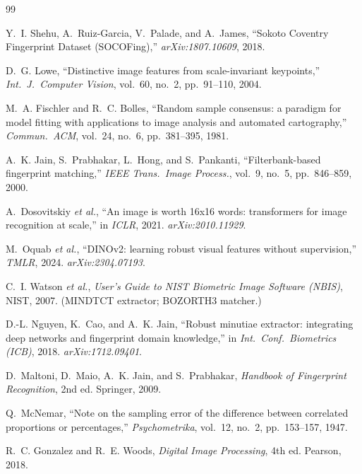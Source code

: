\documentclass[11pt,a4paper]{article}
\begin{document}
\begin{thebibliography}{99}

Y.~I. Shehu, A.~Ruiz-Garcia, V.~Palade, and A.~James,
``Sokoto Coventry Fingerprint Dataset (SOCOFing),''
\emph{arXiv:1807.10609}, 2018.

D.~G. Lowe,
``Distinctive image features from scale-invariant keypoints,''
\emph{Int.\ J.\ Computer Vision}, vol.~60, no.~2, pp.~91--110, 2004.

M.~A. Fischler and R.~C. Bolles,
``Random sample consensus: a paradigm for model fitting with applications to image analysis and automated cartography,''
\emph{Commun.\ ACM}, vol.~24, no.~6, pp.~381--395, 1981.

A.~K. Jain, S.~Prabhakar, L.~Hong, and S.~Pankanti,
``Filterbank-based fingerprint matching,''
\emph{IEEE Trans.\ Image Process.}, vol.~9, no.~5, pp.~846--859, 2000.

A.~Dosovitskiy \emph{et al.},
``An image is worth 16x16 words: transformers for image recognition at scale,''
in \emph{ICLR}, 2021. \emph{arXiv:2010.11929}.

M.~Oquab \emph{et al.},
``DINOv2: learning robust visual features without supervision,''
\emph{TMLR}, 2024. \emph{arXiv:2304.07193}.

C.~I. Watson \emph{et al.},
\emph{User's Guide to NIST Biometric Image Software (NBIS)}, NIST, 2007.
(MINDTCT extractor; BOZORTH3 matcher.)

D.-L. Nguyen, K.~Cao, and A.~K. Jain,
``Robust minutiae extractor: integrating deep networks and fingerprint domain knowledge,''
in \emph{Int.\ Conf.\ Biometrics (ICB)}, 2018. \emph{arXiv:1712.09401}.

D.~Maltoni, D.~Maio, A.~K. Jain, and S.~Prabhakar,
\emph{Handbook of Fingerprint Recognition}, 2nd ed. Springer, 2009.

Q.~McNemar,
``Note on the sampling error of the difference between correlated proportions or percentages,''
\emph{Psychometrika}, vol.~12, no.~2, pp.~153--157, 1947.

R.~C. Gonzalez and R.~E. Woods,
\emph{Digital Image Processing}, 4th ed. Pearson, 2018.

\end{thebibliography}
\end{document}
